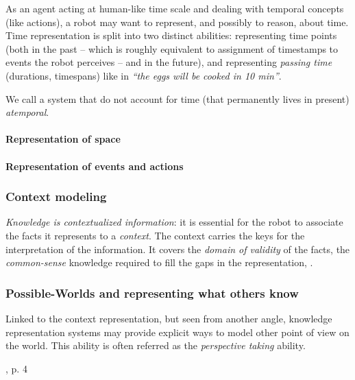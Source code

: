 As an agent acting at human-like time scale and dealing with temporal concepts
(like actions), a robot may want to represent, and possibly to reason, about
time. Time representation is split into two distinct abilities: representing
time points (both in the past -- which is roughly equivalent to assignment of
timestamps to events the robot perceives -- and in the future), and
representing \emph{passing time} (durations, timespans) like in \emph{``the
eggs will be cooked in 10 min''}.


We call a system that do not account for time (\ie that permanently lives in
present) \emph{atemporal}.

\paragraph{Representation of space}

\paragraph{Representation of events and actions}

\subsubsection{Context modeling}

\emph{Knowledge is contextualized information}: it is essential for the robot to associate the facts it
represents to a \emph{context}. The context carries the keys for the
interpretation of the information. It covers the \emph{domain of validity} of
the facts, the \emph{common-sense} knowledge required to fill the gaps in the
representation, .

\subsubsection{Possible-Worlds and representing what others know}
\label{sect|possible-worlds}

    
Linked to the context representation, but seen from another angle, knowledge
representation systems may provide explicit ways to model other point of view
on the world. This ability is often referred as the \emph{perspective taking}
ability.

\cite{Levesque2008}, p. 4

